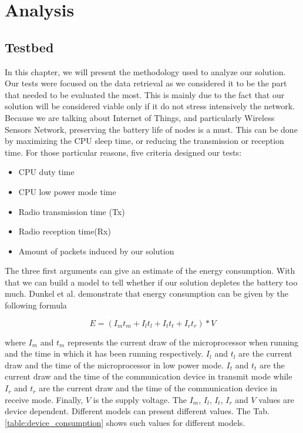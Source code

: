 \part{Analysis}  \label{part:analysis}

\chapter{Testbed}

In this chapter, we will present the methodology used to analyze our solution. Our tests were focused on the data retrieval as we considered it to be the part that needed to be evaluated the most. This is mainly due to the fact that our solution will be considered viable only if it do not stress intensively the network. Because we are talking about Internet of Things, and particularly Wireless Sensors Network, preserving the battery life of nodes is a must. This can be done by maximizing the CPU sleep time, or reducing the transmission or reception time. For those particular reasons, five criteria designed our tests:

\begin{itemize}
  \item CPU duty time
  \item CPU low power mode time
  \item Radio transmission time (Tx)
  \item Radio reception time(Rx)
  \item Amount of packets induced by our solution \\
\end{itemize}

The three first arguments can give an estimate of the energy consumption. With that we can build a model to tell whether if our solution depletes the battery too much. Dunkel et al. \cite{dunkels2007software} demonstrate that energy consumption can be given by the following formula

\begin{equation}
  E = (I_m t_m + I_l t_l + I_t t_t + I_r t_r) * V
\end{equation}

where $I_m$ and $t_m$ represents the current draw of the microprocessor when running and the time in which it has been running respectively. $I_l$ and $t_l$  are the current draw and the time of the microprocessor in low power mode. $I_t$ and $t_t$ are the current draw and the time of the communication device in transmit mode while $I_r$ and $t_r$ are the current draw and the time of the communication device in receive mode. Finally, $V$ is the supply voltage. The $I_m$, $I_l$, $I_t$, $I_r$ and $V$ values are device dependent. Different models can present different values. The Tab.\ref{table:device_consumption} shows such values for different models.\\

